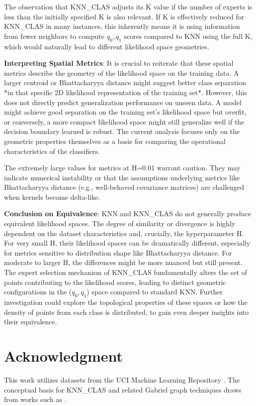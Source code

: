 \documentclass[conference]{IEEEtran}
\begin{document}
The observation that KNN\_CLAS adjusts its K value if the number of experts is less than the initially specified K is also relevant. If K is effectively reduced for KNN\_CLAS in many instances, this inherently means it is using information from fewer neighbors to compute $q_0, q_1$ scores compared to KNN using the full K, which would naturally lead to different likelihood space geometries.

\textbf{Interpreting Spatial Metrics}:
It is crucial to reiterate that these spatial metrics describe the geometry of the likelihood space on the training data. A larger centroid or Bhattacharyya distance might suggest better class separation *in that specific 2D likelihood representation of the training set*. However, this does not directly predict generalization performance on unseen data. A model might achieve good separation on the training set's likelihood space but overfit, or conversely, a more compact likelihood space might still generalize well if the decision boundary learned is robust. The current analysis focuses only on the geometric properties themselves as a basis for comparing the operational characteristics of the classifiers.

The extremely large values for metrics at H=0.01 warrant caution. They may indicate numerical instability or that the assumptions underlying metrics like Bhattacharyya distance (e.g., well-behaved covariance matrices) are challenged when kernels become delta-like.

\textbf{Conclusion on Equivalence}:
KNN and KNN\_CLAS do not generally produce equivalent likelihood spaces. The degree of similarity or divergence is highly dependent on the dataset characteristics and, crucially, the hyperparameter H. For very small H, their likelihood spaces can be dramatically different, especially for metrics sensitive to distribution shape like Bhattacharyya distance. For moderate to larger H, the differences might be more nuanced but still present. The expert selection mechanism of KNN\_CLAS fundamentally alters the set of points contributing to the likelihood scores, leading to distinct geometric configurations in the ($q_0, q_1$) space compared to standard KNN. Further investigation could explore the topological properties of these spaces or how the density of points from each class is distributed, to gain even deeper insights into their equivalence.

\section*{Acknowledgment}
This work utilizes datasets from the UCI Machine Learning Repository \cite{Dua:2019}. The conceptual basis for KNN\_CLAS and related Gabriel graph techniques draws from works such as \cite{torres2016, souza2019, arias2021, arias2024, torres2015, torres2021, torres2015b}.



\end{document}
